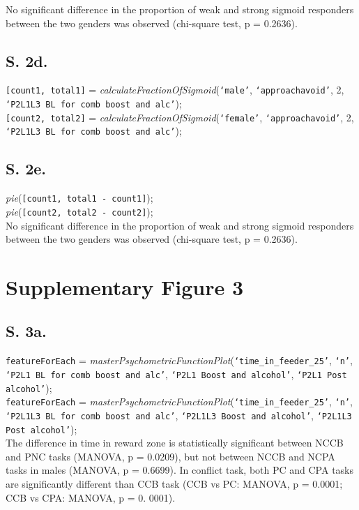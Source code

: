 \documentclass{article}
\begin{document}
No significant difference in the proportion of weak and strong sigmoid responders between the two genders was observed (chi-square test, p = 0.2636).

\subsection{S. 2d.}
\texttt{[count1, total1]} = \emph{calculateFractionOfSigmoid}(\texttt{`male'}, \texttt{`approachavoid'}, 2, \texttt{`P2L1L3 BL for comb boost and alc'});\\
\texttt{[count2, total2]} = \emph{calculateFractionOfSigmoid}(\texttt{`female'}, \texttt{`approachavoid'}, 2, \texttt{`P2L1L3 BL for comb boost and alc'});\\

\subsection{S. 2e.}
\emph{pie}(\texttt{[count1, total1 - count1]});\\
\emph{pie}(\texttt{[count2, total2 - count2]});\\

No significant difference in the proportion of weak and strong sigmoid responders between the two genders was observed (chi-square test, p = 0.2636).


\section{Supplementary Figure 3}
\subsection{S. 3a.}
\texttt{featureForEach} = \emph{masterPsychometricFunctionPlot}(\texttt{`time\_in\_feeder\_25'}, \texttt{`n'}, \texttt{`P2L1 BL for comb boost and alc'}, \texttt{`P2L1 Boost and alcohol'}, \texttt{`P2L1 Post alcohol'});\\

\texttt{featureForEach} = \emph{masterPsychometricFunctionPlot}(\texttt{`time\_in\_feeder\_25'}, \texttt{`n'}, \texttt{`P2L1L3 BL for comb boost and alc'}, \texttt{`P2L1L3 Boost and alcohol'}, \texttt{`P2L1L3 Post alcohol'});\\

The difference in time in reward zone is statistically significant between NCCB and PNC tasks (MANOVA, p = 0.0209), but not between NCCB and NCPA tasks in males (MANOVA, p = 0.6699). In conflict task, both PC and CPA tasks are significantly different than CCB task (CCB vs PC: MANOVA, p = 0.0001; CCB vs CPA: MANOVA, p = 0. 0001).
\end{document}
